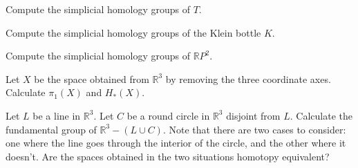 \documentclass{article}
\begin{document}
\begin{exercise}
Compute the simplicial homology groups of $T$. 
\end{exercise}

\begin{exercise}
Compute the simplicial homology groups of the Klein bottle $K$.
\end{exercise}

\begin{exercise}
Compute the simplicial homology groups of $\mathbb{R}P^{2}$. 
\end{exercise}

\begin{exercise}
Let $X$ be the space obtained from $\mathbb{R}^{3}$ by removing the three coordinate axes. Calculate $\pi_{1}(X)$ and $H_{*}(X)$. 
\end{exercise}

\begin{exercise}
Let $L$ be a line in $\mathbb{R}^{3}$. Let $C$ be a round circle in $\mathbb{R}^{3}$ disjoint from $L$. Calculate the fundamental group of $\mathbb{R}^{3} - (L \cup C)$. Note that there are two cases to consider: one where the line goes through the interior of the circle, and the other where it doesn't. Are the spaces obtained in the two situations homotopy equivalent? 
\end{exercise}
\end{document}
